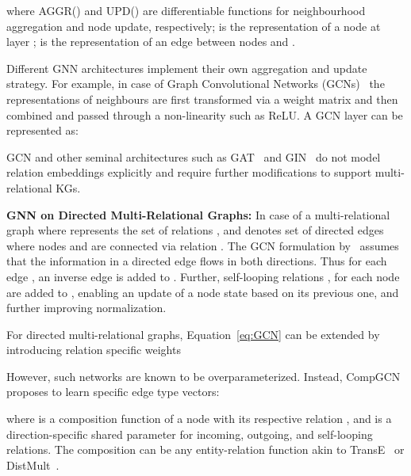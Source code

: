 \documentclass[11pt,a4paper]{article}
\begin{document}
where AGGR() and UPD() are differentiable functions for neighbourhood aggregation and node update, respectively;  is the representation of a node  at layer ;  is the representation of an edge between nodes  and . 







Different GNN architectures implement their own aggregation and update strategy. 
For example, in case of Graph Convolutional Networks (GCNs)~\citep{DBLP:conf/iclr/KipfW17} the representations of neighbours are first transformed via a weight matrix  and then combined and passed through a non-linearity  such as ReLU. A GCN layer  can be represented as:




GCN and other seminal architectures such as GAT~\citep{DBLP:conf/iclr/VelickovicCCRLB18} and GIN~\citep{DBLP:conf/iclr/XuHLJ19} do not model relation embeddings explicitly and require further modifications to support multi-relational KGs.

\textbf{GNN on Directed Multi-Relational  Graphs:} In case of a  multi-relational graph  where  represents the set of relations , and  denotes set of directed edges  where nodes  and  are connected via relation . The GCN formulation by~\citep{DBLP:conf/emnlp/MarcheggianiT17} assumes that the information in a directed edge flows in both directions. Thus for each edge , an inverse edge  is added to . Further, self-looping relations , for each node  are added to , enabling an update of a node state based on its previous one, and further improving normalization. 


For directed multi-relational graphs, Equation~\ref{eq:GCN} can be extended by introducing relation specific weights ~\citep{DBLP:conf/emnlp/MarcheggianiT17,DBLP:conf/esws/SchlichtkrullKB18}




However, such networks are known to be overparameterized. 
Instead, CompGCN~\citep{Vashishth2020Composition-based} proposes to learn specific edge type vectors:



where  is a composition function of a node  with its respective relation , and  is a direction-specific shared parameter for incoming, outgoing, and self-looping relations.
The composition  can be any entity-relation function akin to TransE~\citep{DBLP:conf/nips/BordesUGWY13} or DistMult~\citep{DBLP:journals/corr/YangYHGD14a}.
\end{document}
